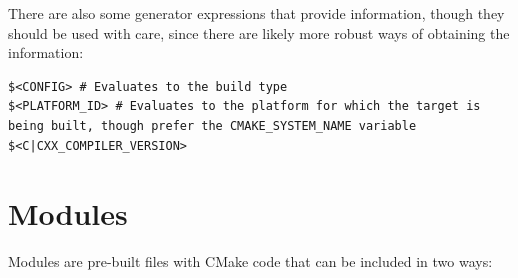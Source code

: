 \documentclass[table, xcdraw]{article}%
\begin{document}
There are also some generator expressions that provide information, though they should be used with care, since there are likely more robust ways of obtaining the information:

\begin{verbatim}
$<CONFIG> # Evaluates to the build type
$<PLATFORM_ID> # Evaluates to the platform for which the target is being built, though prefer the CMAKE_SYSTEM_NAME variable
$<C|CXX_COMPILER_VERSION>
\end{verbatim}

\section{Modules} \label{modules}

Modules are pre-built files with CMake code that can be included in two ways:
\end{document}
